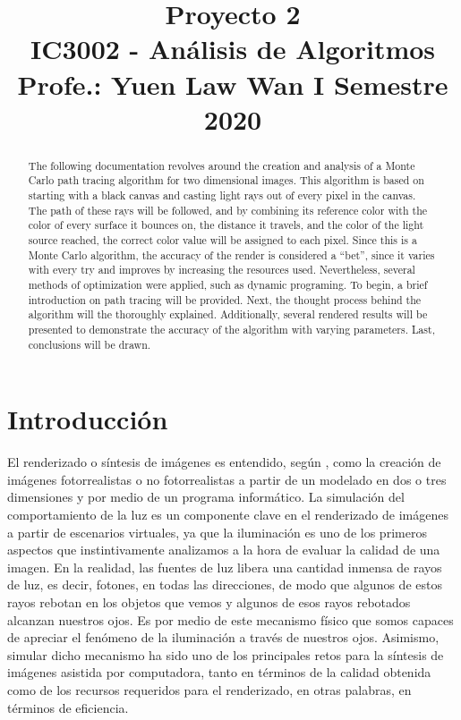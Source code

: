 \documentclass[conference]{IEEEtran}
\begin{document}
\title{Proyecto 2\\
{\footnotesize \textsuperscript{}IC3002 - Análisis de Algoritmos}
{\footnotesize \textsuperscript{}Profe.: Yuen Law Wan}
{\footnotesize \textsuperscript{}I Semestre 2020}
}

\author{
\and
{}
}

\maketitle

\begin{abstract}
The following documentation revolves around the creation and analysis of a Monte Carlo path tracing algorithm for two dimensional images. This algorithm is based on starting with a black canvas and casting light rays out of every pixel in the canvas. The path of these rays will be followed, and by combining its reference color with the color of every surface it bounces on, the distance it travels, and the color of the light source reached, the correct color value will be assigned to each pixel. Since this is a Monte Carlo algorithm, the accuracy of the render is considered a “bet”, since it varies with every try and improves by increasing the resources used. Nevertheless, several methods of optimization were applied, such as dynamic programing. To begin, a brief introduction on path tracing will be provided. Next, the thought process behind the algorithm will the thoroughly explained. Additionally, several rendered results will be presented to demonstrate the accuracy of the algorithm with varying parameters. Last, conclusions will be drawn. 
\end{abstract}

\section{Introducción}

El renderizado o síntesis de imágenes es entendido, según \cite{b1}, como la creación de imágenes fotorrealistas o no fotorrealistas a partir de un modelado en dos o tres dimensiones y por medio de un programa informático. La simulación del comportamiento de la luz es un componente clave en el renderizado de imágenes a partir de escenarios virtuales, ya que la iluminación es uno de los primeros aspectos que instintivamente analizamos a la hora de evaluar la calidad de una imagen. En la realidad, las fuentes de luz libera una cantidad inmensa de rayos de luz, es decir, fotones, en todas las direcciones, de modo que algunos de estos rayos rebotan en los objetos que vemos y algunos de esos rayos rebotados alcanzan nuestros ojos. Es por medio de este mecanismo físico que somos capaces de apreciar el fenómeno de la iluminación a través de nuestros ojos. Asimismo, simular dicho mecanismo ha sido uno de los principales retos para la síntesis de imágenes asistida por computadora, tanto en términos de la calidad obtenida como de los recursos requeridos para el renderizado, en otras palabras, en términos de eficiencia.
\end{document}
